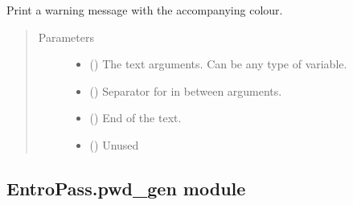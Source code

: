 \documentclass[letterpaper,10pt,english]{sphinxmanual}
\begin{document}
\begin{fulllineitems}
\label{\detokenize{EntroPass:EntroPass.print_utils.warning}}
\sphinxAtStartPar
Print a warning message with the accompanying colour.
\begin{quote}\begin{description}
\item[{Parameters}] \leavevmode\begin{itemize}
\item {} 
\sphinxAtStartPar
{} () \textendash{} The text arguments. Can be any type of variable.

\item {} 
\sphinxAtStartPar
{} (\sphinxstyleliteralemphasis{\sphinxupquote{, }}) \textendash{} Separator for in between arguments.

\item {} 
\sphinxAtStartPar
{} (\sphinxstyleliteralemphasis{\sphinxupquote{, }}) \textendash{} End of the text.

\item {} 
\sphinxAtStartPar
{} () \textendash{} Unused

\end{itemize}

\end{description}\end{quote}

\end{fulllineitems}



\subsection{EntroPass.pwd\_gen module}
\label{\detokenize{EntroPass:module-EntroPass.pwd_gen}}\label{\detokenize{EntroPass:entropass-pwd-gen-module}}
\end{document}
